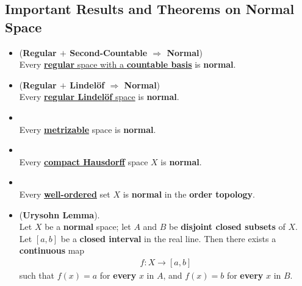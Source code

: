 \documentclass[11pt]{article}
\begin{document}
\subsection{Important Results and Theorems on Normal Space}
\begin{itemize}
\item \begin{theorem} (\textbf{Regular $+$ Second-Countable $\Rightarrow$ Normal})\citep{munkres2000topology}\\
Every \underline{\textbf{regular} space with a \textbf{countable basis}} is \textbf{normal}.
\end{theorem}

\item \begin{proposition}   (\textbf{Regular $+$ Lindel{\"o}f $\Rightarrow$ Normal})\citep{munkres2000topology}\\
Every \underline{\textbf{regular Lindel{\"o}f} space} is \textbf{normal}.
\end{proposition}


\item \begin{theorem} \citep{munkres2000topology}\\
Every \underline{\textbf{metrizable}} space is \textbf{normal}.
\end{theorem}


\item \begin{theorem} \citep{munkres2000topology, reed1980methods}\\
Every \underline{\textbf{compact Hausdorff}} space $X$ is \textbf{normal}.
\end{theorem}

\item \begin{theorem} \citep{munkres2000topology}\\
Every \underline{\textbf{well-ordered}} set $X$ is \textbf{normal} in the \textbf{order topology}.
\end{theorem}


\item \begin{theorem} (\textbf{Urysohn Lemma}). \citep{munkres2000topology}\\
Let $X$ be a \textbf{normal} space; let $A$ and $B$ be \textbf{disjoint closed subsets} of $X$. Let $[a, b]$ be a \textbf{closed interval} in the real line. Then there exists a \textbf{continuous} map
\begin{align*}
f : X \rightarrow [a, b]
\end{align*}
such that $f(x) = a$ for \textbf{every} $x$ in $A$, and $f(x) = b$ for \textbf{every} $x$ in $B$.
\end{theorem}


\end{itemize}
\end{document}
